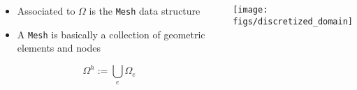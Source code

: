 \begin{frame}
  \begin{columns}[t]
    \begin{block}{}%
      \begin{itemize}
      \item{
	Associated to $\Omega$ is the \texttt{Mesh} data
	structure
      }
	
      \item{A \texttt{Mesh} is basically
	a collection of geometric elements and nodes}
      \end{itemize}
      \begin{equation}
	\label{eqn:discretized_domain}
	\nonumber
	\Omega^h:=\bigcup_e \Omega_e
      \end{equation}
    \end{block}
      \begin{center}
	\texttt{[image: figs/discretized\_domain]}
      \end{center}
  \end{columns}
\end{frame}


